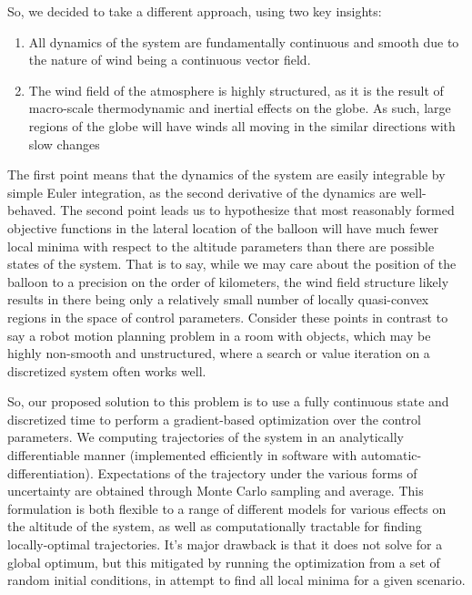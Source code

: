 \documentclass[11pt]{scrartcl} %
\begin{document}
So, we decided to take a different approach, using two key insights:
\begin{enumerate}
\item All dynamics of the system are fundamentally continuous and smooth due to the nature of wind being a continuous vector field.
\item The wind field of the atmosphere is highly structured, as it is the result of macro-scale thermodynamic and inertial effects on the globe. As such, large regions of the globe will have  winds all moving in the similar directions with slow changes
\end{enumerate}
The first point means that the dynamics of the system are easily integrable by simple Euler integration, as the second derivative of the dynamics are well-behaved. The second point leads us to hypothesize that most reasonably formed objective functions in the lateral location of the balloon will have much fewer local minima with respect to the altitude parameters than there are possible states of the system.  That is to say, while we may care about the position of the balloon to a precision on the order of kilometers, the wind field structure likely results in there being only a relatively small number of locally quasi-convex regions in the space of control parameters. Consider these points in contrast to say a robot motion planning problem in a room with objects, which may be highly non-smooth and unstructured, where a search or value iteration on a discretized system often works well. 

So, our proposed solution to this problem is to use a fully continuous state and discretized time to perform a gradient-based optimization over the control parameters. We computing trajectories of the system in an analytically differentiable manner (implemented efficiently in software with automatic-differentiation). Expectations of the trajectory under the various forms of uncertainty are obtained through Monte Carlo sampling and average. This formulation is both flexible to a range of different models for various effects on the altitude of the system, as well as computationally tractable for finding locally-optimal trajectories. It's major drawback is that it does not solve for a global optimum, but this mitigated by running the optimization from a set of random initial conditions, in attempt to find all local minima for a given scenario. 
\end{document}
